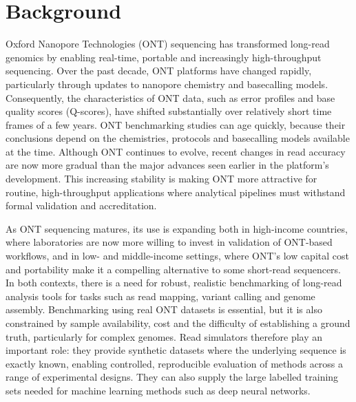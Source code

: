 \documentclass[webpdf,modern,large]{biorxiv}
\begin{document}
\section{Background}

Oxford Nanopore Technologies (ONT) sequencing has transformed long-read genomics by enabling real-time, portable and increasingly high-throughput sequencing\cite{jain2016oxford}. Over the past decade, ONT platforms have changed rapidly, particularly through updates to nanopore chemistry and basecalling models\cite{OxfordNanopore2024,wick2019performance}. Consequently, the characteristics of ONT data, such as error profiles and base quality scores (Q-scores), have shifted substantially over relatively short time frames of a few years\cite{rang2018squiggle,wang2021nanopore}. ONT benchmarking studies can age quickly, because their conclusions depend on the chemistries, protocols and basecalling models available at the time\cite{bogaerts2024closing}. Although ONT continues to evolve, recent changes in read accuracy are now more gradual than the major advances seen earlier in the platform's development. This increasing stability is making ONT more attractive for routine, high-throughput applications where analytical pipelines must withstand formal validation and accreditation\cite{mostafa2024evolution,sereika2022oxford}.

As ONT sequencing matures, its use is expanding both in high-income countries, where laboratories are now more willing to invest in validation of ONT-based workflows, and in low- and middle-income settings, where ONT's low capital cost and portability make it a compelling alternative to some short-read sequencers\cite{avershina2022ultrafast, moso2024non, sheka2021oxford}. In both contexts, there is a need for robust, realistic benchmarking of long-read analysis tools for tasks such as read mapping, variant calling and genome assembly\cite{wick2025autocycler, sovic2016fast, cretu2017mapping}. Benchmarking using real ONT datasets is essential, but it is also constrained by sample availability, cost and the difficulty of establishing a ground truth, particularly for complex genomes\cite{wick2025autocycler}. Read simulators therefore play an important role: they provide synthetic datasets where the underlying sequence is exactly known, enabling controlled, reproducible evaluation of methods across a range of experimental designs. They can also supply the large labelled training sets needed for machine learning methods such as deep neural networks\cite{vrcek2025}.
\end{document}
